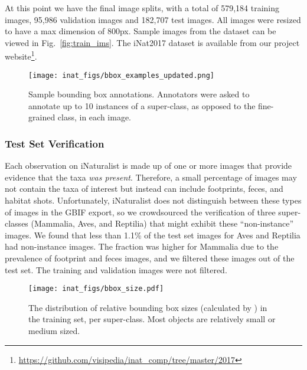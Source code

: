 \documentclass[10pt,twocolumn,letterpaper]{article}
\begin{document}
At this point we have the final image splits, with a total of 579,184 training images, 95,986 validation images and 182,707 test images. 
All images were resized to have a max dimension of 800px. Sample images from the dataset can be viewed in Fig.~\ref{fig:train_ims}.
The iNat2017 dataset is available from our project website\footnote{\url{https://github.com/visipedia/inat_comp/tree/master/2017}}.




\begin{figure}[t]
\centering
\texttt{[image: inat\_figs/bbox\_examples\_updated.png]}
\caption{Sample bounding box annotations. Annotators were asked to annotate up to 10  instances of a super-class, as opposed to the fine-grained class, in each image.} 
\label{fig:bbox_examples}
\end{figure}




\subsubsection{Test Set Verification}
\label{sec:dataset_verification}
Each observation on iNaturalist is made up of one or more images that provide evidence that the taxa \emph{was present}. Therefore, a small percentage of images may not contain the taxa of interest but instead can include footprints, feces, and habitat shots. Unfortunately, iNaturalist does not distinguish between these types of images in the GBIF export, so we crowdsourced the verification of three super-classes (Mammalia, Aves, and Reptilia) that might exhibit these ``non-instance'' images. We found that less than 1.1\%  of the test set images for Aves and Reptilia had non-instance images. The fraction was higher for Mammalia due to the prevalence of footprint and feces images, and we filtered these images out of the test set. The training and validation images were not filtered.



\begin{figure}[t]
\centering
\texttt{[image: inat\_figs/bbox\_size.pdf]}
\caption{The distribution of relative bounding box sizes (calculated by ) in the training set, per super-class. Most objects are relatively small or medium sized.
} 
\label{fig:bbox_size}
\vspace{-3mm}
\end{figure}
\end{document}

